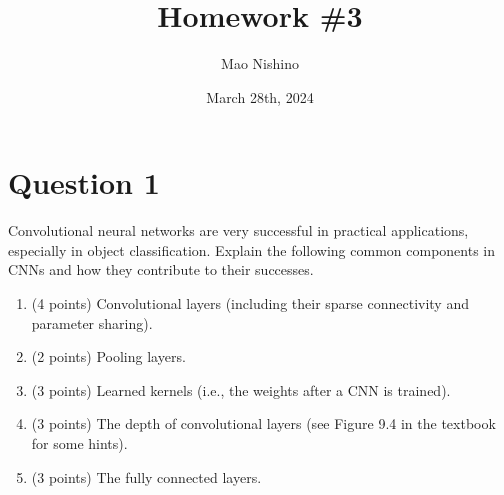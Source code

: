 \documentclass[
	12pt, %
]{../Template/fphw}
\title{Homework \#3} %
\author{Mao Nishino} %
\date{March 28th, 2024} %
\institute{Florida State University \\ Department of Computer Science} %
\begin{document}
\maketitle %


\section*{Question 1}

\begin{problem}
 Convolutional neural networks are very successful in practical applications, especially in object
classification. Explain the following common components in CNNs and how they contribute to their successes.
\begin{enumerate}[label=(\arabic*)]
\item (4 points) Convolutional layers (including their sparse connectivity and parameter sharing).
\item (2 points) Pooling layers.
\item (3 points) Learned kernels (i.e., the weights after a CNN is trained).
\item (3 points) The depth of convolutional layers (see Figure 9.4 in the textbook for some hints).
\item (3 points) The fully connected layers.
\end{enumerate}
\end{problem}

\end{document}
